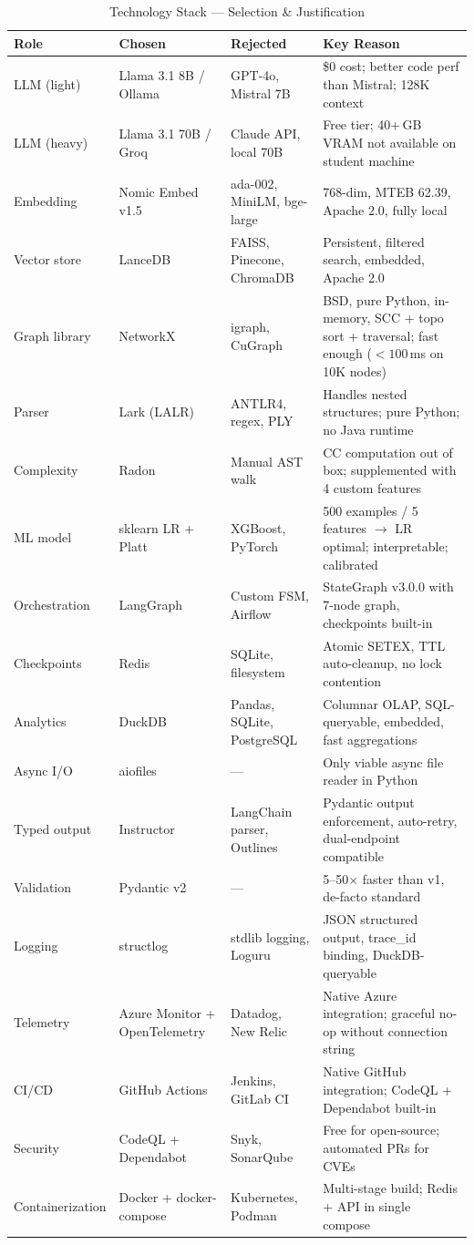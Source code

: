 \documentclass[11pt,a4paper]{article}
\begin{document}
\begin{table}[H]
\centering
\caption{Technology Stack — Selection \& Justification}
\renewcommand{\arraystretch}{1.25}
\small
\begin{tabularx}{\textwidth}{@{} l l l X @{}}
\toprule
\textbf{Role} & \textbf{Chosen} & \textbf{Rejected} & \textbf{Key Reason} \\
\midrule
LLM (light) & Llama 3.1 8B / Ollama & GPT-4o, Mistral 7B & \$0 cost; better code perf than Mistral; 128K context \\
LLM (heavy) & Llama 3.1 70B / Groq & Claude API, local 70B & Free tier; 40+\,GB VRAM not available on student machine \\
Embedding & Nomic Embed v1.5 & ada-002, MiniLM, bge-large & 768-dim, MTEB 62.39, Apache 2.0, fully local \\
Vector store & LanceDB & FAISS, Pinecone, ChromaDB & Persistent, filtered search, embedded, Apache 2.0 \\
Graph library & NetworkX & igraph, CuGraph & BSD, pure Python, in-memory, SCC + topo sort + traversal; fast enough ($<100$\,ms on 10K nodes) \\
Parser & Lark (LALR) & ANTLR4, regex, PLY & Handles nested structures; pure Python; no Java runtime \\
Complexity & Radon & Manual AST walk & CC computation out of box; supplemented with 4 custom features \\
ML model & sklearn LR + Platt & XGBoost, PyTorch & 500 examples / 5 features $\to$ LR optimal; interpretable; calibrated \\
Orchestration & LangGraph & Custom FSM, Airflow & StateGraph v3.0.0 with 7-node graph, checkpoints built-in \\
Checkpoints & Redis & SQLite, filesystem & Atomic SETEX, TTL auto-cleanup, no lock contention \\
Analytics & DuckDB & Pandas, SQLite, PostgreSQL & Columnar OLAP, SQL-queryable, embedded, fast aggregations \\
Async I/O & aiofiles & — & Only viable async file reader in Python \\
Typed output & Instructor & LangChain parser, Outlines & Pydantic output enforcement, auto-retry, dual-endpoint compatible \\
Validation & Pydantic v2 & — & 5–50$\times$ faster than v1, de-facto standard \\
Logging & structlog & stdlib logging, Loguru & JSON structured output, trace\_id binding, DuckDB-queryable \\
Telemetry & Azure Monitor + OpenTelemetry & Datadog, New Relic & Native Azure integration; graceful no-op without connection string \\
CI/CD & GitHub Actions & Jenkins, GitLab CI & Native GitHub integration; CodeQL + Dependabot built-in \\
Security & CodeQL + Dependabot & Snyk, SonarQube & Free for open-source; automated PRs for CVEs \\
Containerization & Docker + docker-compose & Kubernetes, Podman & Multi-stage build; Redis + API in single compose \\
\bottomrule
\end{tabularx}
\end{table}
\end{document}
